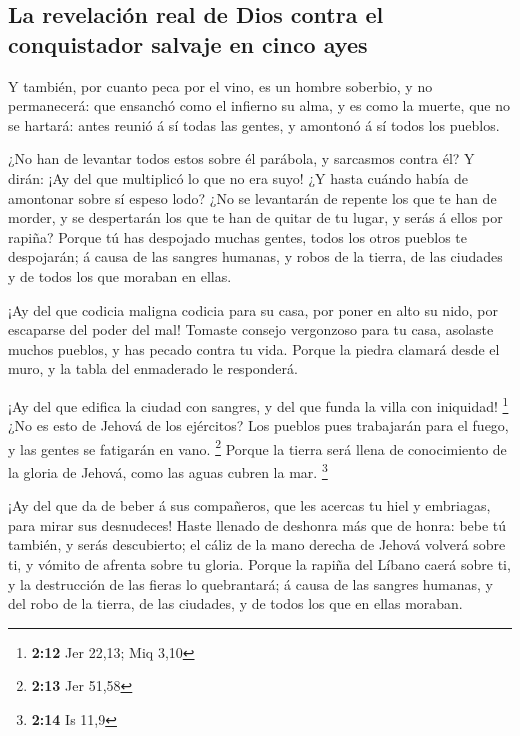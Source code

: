 \hypertarget{la-revelaciuxf3n-real-de-dios-contra-el-conquistador-salvaje-en-cinco-ayes}{%
\subsection{La revelación real de Dios contra el conquistador salvaje en
cinco
ayes}\label{la-revelaciuxf3n-real-de-dios-contra-el-conquistador-salvaje-en-cinco-ayes}}

 Y también, por cuanto peca por el vino, es un hombre
soberbio, y no permanecerá: que ensanchó como el infierno su alma, y es
como la muerte, que no se hartará: antes reunió á sí todas las gentes, y
amontonó á sí todos los pueblos.

 ¿No han de levantar todos estos sobre él parábola, y
sarcasmos contra él? Y dirán: ¡Ay del que multiplicó lo que no era suyo!
¿Y hasta cuándo había de amontonar sobre sí espeso lodo? 
¿No se levantarán de repente los que te han de morder, y se despertarán
los que te han de quitar de tu lugar, y serás á ellos por rapiña?
 Porque tú has despojado muchas gentes, todos los otros
pueblos te despojarán; á causa de las sangres humanas, y robos de la
tierra, de las ciudades y de todos los que moraban en ellas.

 ¡Ay del que codicia maligna codicia para su casa, por
poner en alto su nido, por escaparse del poder del mal! 
Tomaste consejo vergonzoso para tu casa, asolaste muchos pueblos, y has
pecado contra tu vida.  Porque la piedra clamará desde el
muro, y la tabla del enmaderado le responderá.

 ¡Ay del que edifica la ciudad con sangres, y del que
funda la villa con iniquidad! \footnote{\textbf{2:12} Jer 22,13; Miq
  3,10}  ¿No es esto de Jehová de los ejércitos? Los
pueblos pues trabajarán para el fuego, y las gentes se fatigarán en
vano. \footnote{\textbf{2:13} Jer 51,58}  Porque la
tierra será llena de conocimiento de la gloria de Jehová, como las aguas
cubren la mar. \footnote{\textbf{2:14} Is 11,9}

 ¡Ay del que da de beber á sus compañeros, que les
acercas tu hiel y embriagas, para mirar sus desnudeces! 
Haste llenado de deshonra más que de honra: bebe tú también, y serás
descubierto; el cáliz de la mano derecha de Jehová volverá sobre ti, y
vómito de afrenta sobre tu gloria.  Porque la rapiña del
Líbano caerá sobre ti, y la destrucción de las fieras lo quebrantará; á
causa de las sangres humanas, y del robo de la tierra, de las ciudades,
y de todos los que en ellas moraban.


